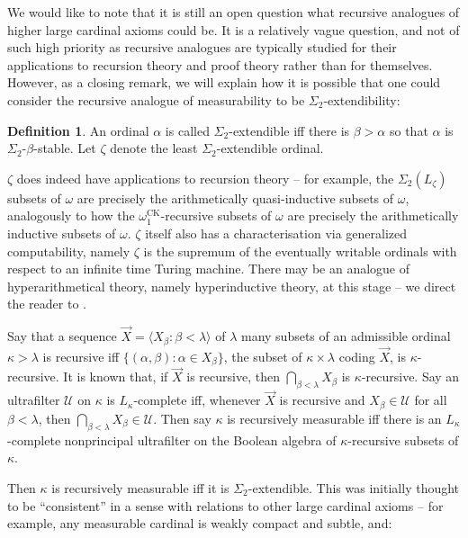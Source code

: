 \documentclass{article}
\theoremstyle{definition}
\newtheorem{definition}{Definition}[section]
\theoremstyle{plain}
\theoremstyle{plain}
\theoremstyle{plain}
\theoremstyle{plain}
\theoremstyle{remark}
\theoremstyle{remark}
\theoremstyle{remark}
\theoremstyle{plain}
\theoremstyle{plain}
\theoremstyle{plain}
\begin{document}
We would like to note that it is still an open question what recursive analogues of higher large cardinal axioms could be. It is a relatively vague question, and not of such high priority as recursive analogues are typically studied for their applications to recursion theory and proof theory rather than for themselves. However, as a closing remark, we will explain how it is possible that one could consider the recursive analogue of measurability to be $\Sigma_2$-extendibility:

\begin{definition}
\label{Extendible}
An ordinal $\alpha$ is called $\Sigma_2$-extendible iff there is $\beta > \alpha$ so that $\alpha$ is $\Sigma_2$-$\beta$-stable. Let $\zeta$ denote the least $\Sigma_2$-extendible ordinal.
\end{definition}

$\zeta$ does indeed have applications to recursion theory -- for example, the $\Sigma_2(L_\zeta)$ subsets of $\omega$ are precisely the arithmetically quasi-inductive subsets of $\omega$, analogously to how the $\omega_1^{\mathrm{CK}}$-recursive subsets of $\omega$ are precisely the arithmetically inductive subsets of $\omega$. $\zeta$ itself also has a characterisation via generalized computability, namely $\zeta$ is the supremum of the eventually writable ordinals with respect to an infinite time Turing machine. There may be an analogue of hyperarithmetical theory, namely hyperinductive theory, at this stage -- we direct the reader to \cite{klev}.

Say that a sequence $\vec{X} = \langle X_\beta: \beta < \lambda \rangle$ of $\lambda$ many subsets of an admissible ordinal $\kappa > \lambda$ is recursive iff $\{(\alpha, \beta): \alpha \in X_\beta\}$, the subset of $\kappa \times \lambda$ coding $\vec{X}$, is $\kappa$-recursive. It is known that, if $\vec{X}$ is recursive, then $\bigcap_{\beta < \lambda} X_\beta$ is $\kappa$-recursive. Say an ultrafilter $\mathcal{U}$ on $\kappa$ is $L_\kappa$-complete iff, whenever $\vec{X}$ is recursive and $X_\beta \in \mathcal{U}$ for all $\beta < \lambda$, then $\bigcap_{\beta < \lambda} X_\beta \in \mathcal{U}$. Then say $\kappa$ is recursively measurable iff there is an $L_\kappa$-complete nonprincipal ultrafilter on the Boolean algebra of $\kappa$-recursive subsets of $\kappa$.

Then $\kappa$ is recursively measurable iff it is $\Sigma_2$-extendible. This was initially thought to be ``consistent'' in a sense with relations to other large cardinal axioms -- for example, any measurable cardinal is weakly compact and subtle, and:
\end{document}
